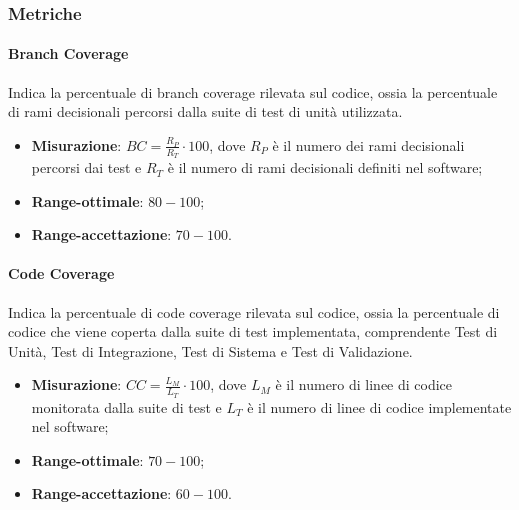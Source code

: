 \subsubsection{Metriche}
\paragraph{Branch Coverage}
\label{coperturaTest}
Indica la percentuale di branch coverage rilevata sul codice, ossia la percentuale di rami decisionali percorsi dalla suite di test di unità utilizzata.
\begin{itemize}
\item \textbf{Misurazione}: $BC=\frac{R_{P}}{R_{T}} \cdot 100$, dove $R_{P}$ è il numero dei rami decisionali percorsi dai test e $R_{T}$ è il numero di rami decisionali definiti nel software;
\item \textbf{Range-ottimale}: $80 - 100$;
\item \textbf{Range-accettazione}: $70 - 100$.
\end{itemize}
\paragraph{Code Coverage}
\label{codeCoverage}
Indica la percentuale di code coverage rilevata sul codice, ossia la percentuale di codice che viene coperta dalla suite di test implementata, comprendente Test di Unità, Test di Integrazione, Test di Sistema e Test di Validazione.
\begin{itemize}
\item \textbf{Misurazione}: $CC=\frac{L_{M}}{L_{T}} \cdot 100$, dove $L_{M}$ è il numero di linee di codice monitorata dalla suite di test e $L_{T}$ è il numero di linee di codice implementate nel software;
\item \textbf{Range-ottimale}: $70 - 100$;
\item \textbf{Range-accettazione}: $60 - 100$.
\end{itemize}
